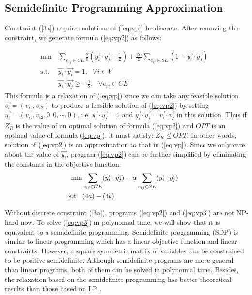 \documentclass[10pt,conference]{IEEEtran}
\begin{document}
\subsection{Semidefinite Programming Approximation}

Constraint (\ref{3a}) requires solutions of (\ref{eq:vp}) be discrete.
After removing this constraint, we generate formula (\ref{eq:vp2}) as follows:

\begin{align}
    \label{eq:vp2}
    \textrm{min}  & \sum_{e_{ij} \in CE} \frac{2}{3} ( \vec{y_i} \cdot \vec{y_j} + \frac{1}{2} ) + \frac{2\alpha}{3} \sum_{e_{ij} \in SE} ( 1 - \vec{y_i} \cdot \vec{y_j} ) \\
    \textrm{s.t}.\ \	& \vec{y_i} \cdot \vec{y_i} = 1 , \ \ \                   		\forall i \in V			&\label{vp2:a}\tag{$4a$}\\
    				& \vec{y_i} \cdot \vec{y_j} \ge -\frac{1}{2},   \ \ \ \forall e_{ij} \in CE 			& \label{vp2:b}\tag{$4b$}
\end{align}
This formula is a relaxation of (\ref{eq:vp}) since we can take any feasible solution $\vec{v_i} = (v_{i1}, v_{i2})$ to produce a feasible solution of (\ref{eq:vp2}) by setting $\vec{y_i} = (v_{i1}, v_{i2}, 0, 0, \cdots, 0)$, i.e. $\vec{y_i} \cdot \vec{y_j} = 1$ and $\vec{y_i} \cdot \vec{y_j} = \vec{v_i} \cdot \vec{v_j}$ in this solution. Thus if $Z_{R}$ is the value of an optimal solution of formula (\ref{eq:vp2}) and $OPT$ is an optimal value of formula (\ref{eq:vp}), it must satisfy: $Z_{R} \le OPT$.
In other words, solution of (\ref{eq:vp2}) is an approximation to that in (\ref{eq:vp}).
Since we only care about the value of $\vec{y_i}$, program (\ref{eq:vp2}) can be further simplified by eliminating the constants in the objective function:
\begin{align}
    \label{eq:vp3}
    \textrm{min} 	& \sum_{e_{ij} \in CE} (\vec{y_i} \cdot \vec{y_j}) - \alpha \sum_{e_{ij} \in SE} (\vec{y_i} \cdot \vec{y_j}) &\\
    \textrm{s.t}.	\ \	& (4a) - (4b)		&\notag
\end{align}

Without discrete constraint (\ref{3a}), programs (\ref{eq:vp2}) and (\ref{eq:vp3}) are not NP-hard now.
To solve (\ref{eq:vp3}) in polynomial time, we will show that it is equivalent to a semidefinite programming.
Semidefinite programming (SDP) is similar to linear programming which has a linear objective function and linear constraints.
However, a square symmetric matrix of variables can be constrained to be positive semidefinite.
Although semidefinite programs are more general than linear programs, both of them can be solved in polynomial time.
Besides, the relaxation based on the semidefinite programming has better theoretical results than those based on LP \cite{SDP_1996Boyed}.
\end{document}
